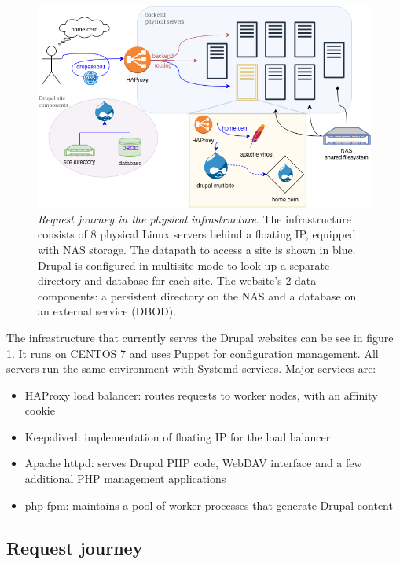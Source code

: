 \begin{figure}[t]
    \centering
    \hspace{-2em}
    \includegraphics[width=\textwidth]{figures/drupal-physical-request-journey}
    \caption{\emph{Request journey in the physical infrastructure}.
    The infrastructure consists of 8 physical Linux servers behind a floating IP, equipped with NAS storage.
    The {\color{blue} datapath} to access a site is shown in blue. 
    Drupal is configured in multisite mode to look up a separate directory and database for each site.
    The website's {\color{asparagus} 2 data components}: a persistent directory on the NAS and a database on an external service (DBOD).
    }
    \label{fig:drupal-physical-request-journey}
\end{figure}

The infrastructure that currently serves the Drupal websites can be see in figure \ref{fig:drupal-physical-request-journey}.
It runs on CENTOS 7 and uses Puppet for configuration management.
All servers run the same environment with Systemd services.
Major services are:
\begin{itemize}
    \item HAProxy load balancer: routes requests to worker nodes, with an affinity cookie
    \item Keepalived: implementation of floating IP for the load balancer
    \item Apache httpd: serves Drupal PHP code, WebDAV interface and a few additional PHP management applications
    \item php-fpm: maintains a pool of worker processes that generate Drupal content
\end{itemize}

\subsection{Request journey}

